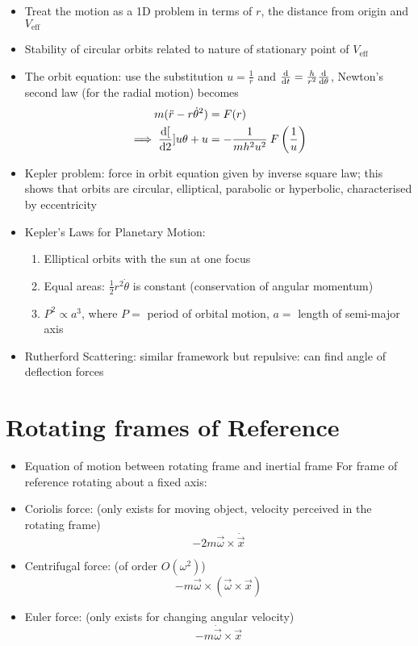 \begin{itemize}
    \item Treat the motion as a 1D problem in terms of $r$, the distance from origin and $V_{\textrm{eff}}$
    \item Stability of circular orbits related to nature of stationary point of $V_{\textrm{eff}}$
    \item The orbit equation: use the substitution $u = \frac{1}{r}$ and $ \frac{\mathrm{d}}{\mathrm{d}{t}} = \frac{h}{r^2}\frac{\mathrm{d}}{\mathrm{d}{\theta}}$, Newton's second law (for the radial motion) becomes
          \begin{align*}
              m(\ddot{r} - r \dot{\theta}^2) & = F(r)                                                \\
              \implies
              \frac{\mathrm{d}{[}}{\mathrm{d}{2}}]{u}{\theta} + u         & = -\frac{1}{mh^2 u^2} \: F \left( \frac{1}{u} \right)
          \end{align*}
    \item Kepler problem: force in orbit equation given by inverse square law; this shows that orbits are circular, elliptical, parabolic or hyperbolic, characterised by eccentricity
    \item Kepler's Laws for Planetary Motion:
          \begin{enumerate}
              \item Elliptical orbits with the sun at one focus
              \item Equal areas: $\frac{1}{2}r^2 \dot{\theta}$ is constant (conservation of angular momentum)
              \item $ P^2 \propto a^3$, where $P =$ period of orbital motion, $a =$ length of semi-major axis
          \end{enumerate}
    \item Rutherford Scattering: similar framework but repulsive: can find angle of deflection forces
\end{itemize}

\section{Rotating frames of Reference}
\begin{itemize}
    \item Equation of motion between rotating frame and inertial frame
          For frame of reference rotating about a fixed axis:
    \item Coriolis force: (only exists for moving object, velocity perceived in the rotating frame)
          \[-2m \vec{\omega} \times \dot{\vec{x}} \]
    \item Centrifugal force: (of order $O(\omega^2)$)
          \[-m \vec{\omega}\times (\vec{\omega} \times \vec{x}) \]
    \item Euler force: (only exists for changing angular velocity) \[-m \dot{\vec{\omega}} \times \vec{x}\]
\end{itemize}

